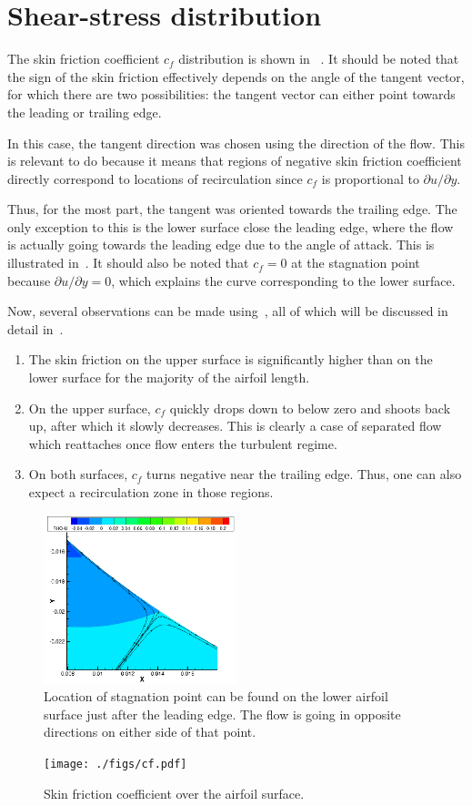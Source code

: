 \section{Shear-stress distribution}
The skin friction coefficient $c_f$ distribution is shown in
~. It should be noted that the sign of the skin friction
effectively depends on the angle of the tangent vector, for which there
are two possibilities: the tangent vector can either point towards
the leading or trailing edge.

In this case, the tangent direction was chosen using the direction of the flow. This
is relevant to do because it means that regions of negative skin friction coefficient
directly correspond to locations of recirculation since $c_f$ is proportional to
$\partial u/\partial y$.

Thus, for the most part, the tangent was oriented towards the trailing edge.
The only exception to this is the lower surface close the leading edge,
where the flow is actually going towards the leading edge due to the angle of
attack. This is illustrated in~. It should also be noted that
$c_f = 0$ at the stagnation point because $\partial u/\partial y = 0$, which explains the
curve corresponding to the lower surface.

Now, several observations can be made using~, all of which will
be discussed in detail in~.
\begin{enumerate}
    \item The skin friction on the upper surface is significantly higher than on
        the lower surface for the majority of the airfoil length.
    \item On the upper surface, $c_f$ quickly drops down to below zero and shoots back up,
        after which it slowly decreases. This is clearly a case of separated flow which
        reattaches once flow enters the turbulent regime.
    \item On both surfaces, $c_f$ turns negative near the trailing edge. Thus, one can also
        expect a recirculation zone in those regions.
\end{enumerate}

\begin{figure}[H]
    \centering
    \includegraphics[width=0.5\textwidth]{./figs/stagnation.png}
    \caption{Location of stagnation point can be found on the lower airfoil surface
        just after the leading edge. The flow is going in opposite directions
        on either side of that point.}\label{fig:stag}
\end{figure}

\begin{figure}
    \centering
    \texttt{[image: ./figs/cf.pdf]}
    \caption{Skin friction coefficient over the airfoil surface.}\label{fig:cf}
\end{figure}


